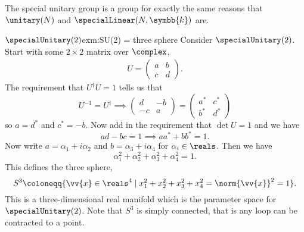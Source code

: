 \documentclass[fleqn]{NotesClass}
\newcommand{\ident}{1}
\newcommand{\sphere}[1][n]{S^{#1}}
\newcommand{\hermit}{\dagger}
\renewcommand{\field}{\symbb{k}}
\begin{document}
    The special unitary group is a group for exactly the same reasons that \(\unitary(N)\) and \(\specialLinear(N, \field)\) are.
    
    \begin{exm}{\(\specialUnitary(2)\)}{exm:SU(2) = three sphere}
        Consider \(\specialUnitary(2)\).
        Start with some \(2\times 2\) matrix over \(\complex\),
        \begin{align}
            U = 
            \begin{pmatrix}
                a & b\\ c & d
            \end{pmatrix}
            .
        \end{align}
        The requirement that \(U^\hermit U = \ident\) tells us that
        \begin{equation}
            U^{-1} = U^{\hermit} \implies 
            \begin{pmatrix}
                d & -b\\
                -c & a
            \end{pmatrix}
            =
            \begin{pmatrix}
                a^* & c^*\\
                b^* & d^*
            \end{pmatrix}
        \end{equation}
        so \(a = d^*\) and \(c^* = -b\).
        Now add in the requirement that \(\det U = 1\) and we have
        \begin{equation}
            ad - bc = 1 \implies aa^* + bb^* = 1.
        \end{equation}
        Now write \(a = \alpha_1 + i \alpha_2\) and \(b = \alpha_3 + i\alpha_4\) for \(\alpha_i \in \reals\).
        Then we have
        \begin{equation}
            \alpha_1^2 + \alpha_2^2 + \alpha_3^2 + \alpha_4^2 = 1.
        \end{equation}
        This defines the three sphere,
        \begin{equation}
            \sphere[3] \coloneqq \{\vv{x} \in \reals^4 \mid x_1^2 + x_2^2 + x_3^2 + x_4^2 = \norm{\vv{x}}^2 = 1\}.
        \end{equation}
        This is a three-dimensional real manifold which is the parameter space for \(\specialUnitary(2)\).
        Note that \(\sphere[3]\) is simply connected, that is any loop can be contracted to a point.
    \end{exm}
    
\end{document}
